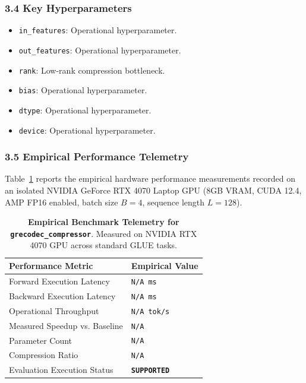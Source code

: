 \subsubsection*{3.4 Key Hyperparameters}
\begin{itemize}
    \item \texttt{in\_features}: Operational hyperparameter.
    \item \texttt{out\_features}: Operational hyperparameter.
    \item \texttt{rank}: Low-rank compression bottleneck.
    \item \texttt{bias}: Operational hyperparameter.
    \item \texttt{dtype}: Operational hyperparameter.
    \item \texttt{device}: Operational hyperparameter.
\end{itemize}

\subsubsection*{3.5 Empirical Performance Telemetry}
Table~\ref{tab:telemetry_grecodec_compressor} reports the empirical hardware performance measurements recorded on an isolated NVIDIA GeForce RTX 4070 Laptop GPU (8GB VRAM, CUDA 12.4, AMP FP16 enabled, batch size $B=4$, sequence length $L=128$).

\begin{table}[h]
\centering
\small
\caption{\textbf{Empirical Benchmark Telemetry for \texttt{grecodec\_compressor}}. Measured on NVIDIA RTX 4070 GPU across standard GLUE tasks.}
\label{tab:telemetry_grecodec_compressor}
\begin{tabularx}{\columnwidth}{lX}
\toprule
\textbf{Performance Metric} & \textbf{Empirical Value} \\
\midrule
Forward Execution Latency & \texttt{N/A ms} \\
Backward Execution Latency & \texttt{N/A ms} \\
Operational Throughput & \texttt{N/A tok/s} \\
Measured Speedup vs. Baseline & \texttt{N/A} \\
Parameter Count & \texttt{N/A} \\
Compression Ratio & \texttt{N/A} \\
Evaluation Execution Status & \textbf{\texttt{SUPPORTED}} \\
\bottomrule
\end{tabularx}
\end{table}

